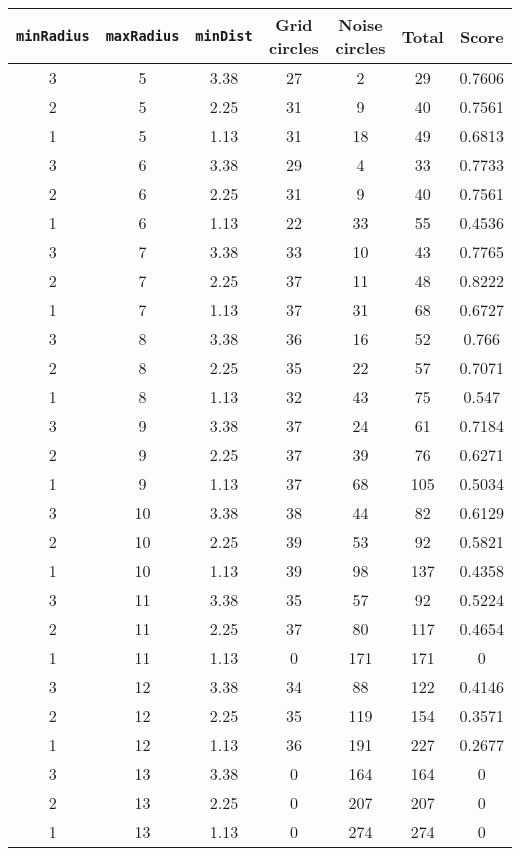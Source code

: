 \documentclass[letterpaper, 12pt]{article}
\begin{document}
\begin{longtable}{|c|c|c|c|c|c|c|}
\hline
\textbf{\texttt{minRadius}} & \textbf{\texttt{maxRadius}} & \textbf{\texttt{minDist}} & \textbf{Grid circles} & \textbf{Noise circles} & \textbf{Total} & \textbf{Score} \\
\hline
3 & 5 & 3.38 & 27 & 2 & 29 & 0.7606 \\
\hline
2 & 5 & 2.25 & 31 & 9 & 40 & 0.7561 \\
\hline
1 & 5 & 1.13 & 31 & 18 & 49 & 0.6813 \\
\hline
3 & 6 & 3.38 & 29 & 4 & 33 & 0.7733 \\
\hline
2 & 6 & 2.25 & 31 & 9 & 40 & 0.7561 \\
\hline
1 & 6 & 1.13 & 22 & 33 & 55 & 0.4536 \\
\hline
3 & 7 & 3.38 & 33 & 10 & 43 & 0.7765 \\
\hline
2 & 7 & 2.25 & 37 & 11 & 48 & 0.8222 \\
\hline
1 & 7 & 1.13 & 37 & 31 & 68 & 0.6727 \\
\hline
3 & 8 & 3.38 & 36 & 16 & 52 & 0.766 \\
\hline
2 & 8 & 2.25 & 35 & 22 & 57 & 0.7071 \\
\hline
1 & 8 & 1.13 & 32 & 43 & 75 & 0.547 \\
\hline
3 & 9 & 3.38 & 37 & 24 & 61 & 0.7184 \\
\hline
2 & 9 & 2.25 & 37 & 39 & 76 & 0.6271 \\
\hline
1 & 9 & 1.13 & 37 & 68 & 105 & 0.5034 \\
\hline
3 & 10 & 3.38 & 38 & 44 & 82 & 0.6129 \\
\hline
2 & 10 & 2.25 & 39 & 53 & 92 & 0.5821 \\
\hline
1 & 10 & 1.13 & 39 & 98 & 137 & 0.4358 \\
\hline
3 & 11 & 3.38 & 35 & 57 & 92 & 0.5224 \\
\hline
2 & 11 & 2.25 & 37 & 80 & 117 & 0.4654 \\
\hline
1 & 11 & 1.13 & 0 & 171 & 171 & 0 \\
\hline
3 & 12 & 3.38 & 34 & 88 & 122 & 0.4146 \\
\hline
2 & 12 & 2.25 & 35 & 119 & 154 & 0.3571 \\
\hline
1 & 12 & 1.13 & 36 & 191 & 227 & 0.2677 \\
\hline
3 & 13 & 3.38 & 0 & 164 & 164 & 0 \\
\hline
2 & 13 & 2.25 & 0 & 207 & 207 & 0 \\
\hline
1 & 13 & 1.13 & 0 & 274 & 274 & 0 \\

\end{longtable}
\end{document}
